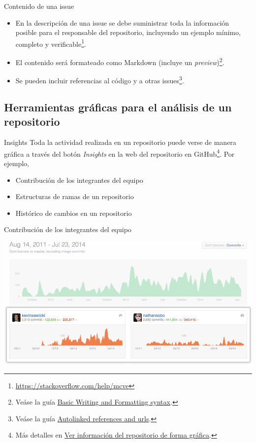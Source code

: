 \documentclass[xcolor={usenames,svgnames,dvipsnames}]{beamer}
\begin{document}
\begin{frame}[label={sec:org35d97a9}]{Contenido de una issue}
\begin{itemize}
\item En la descripción de una issue se debe suministrar toda la información posible para el responsable del repositorio, \alert{incluyendo un ejemplo mínimo, completo y verificable}\footnote{\url{https://stackoverflow.com/help/mcve}}.

\item El contenido será formateado como Markdown (incluye un \emph{preview})\footnote{Veáse la guía \href{https://help.github.com/articles/basic-writing-and-formatting-syntax/}{Basic Writing and Formatting syntax}.}.

\item Se pueden incluir referencias al código y a otras issues\footnote{Veáse la guía \href{https://help.github.com/articles/autolinked-references-and-urls/}{Autolinked references and urls}.}.
\end{itemize}
\end{frame}


\subsection{Herramientas gráficas para el análisis de un repositorio}
\label{sec:orgb550a1b}

\begin{frame}[label={sec:org9c377d0}]{Insights}
Toda la actividad realizada en un repositorio puede verse de manera gráfica a través del botón \emph{Insights} en la web del repositorio en GitHub\footnote{Más detalles en \href{https://help.github.com/categories/visualizing-repository-data-with-graphs/}{Ver información del repositorio de forma gráfica}.}. Por ejemplo,

\begin{itemize}
\item Contribución de los integrantes del equipo
\item Estructuras de ramas de un repositorio
\item Histórico de cambios en un repositorio
\end{itemize}
\end{frame}

\begin{frame}[label={sec:orgbac9272}]{Contribución de los integrantes del equipo}
\begin{center}
\includegraphics[width=.9\linewidth]{figs/repo_contributors_specific_graph.png}
\end{center}
\end{frame}
\end{document}
